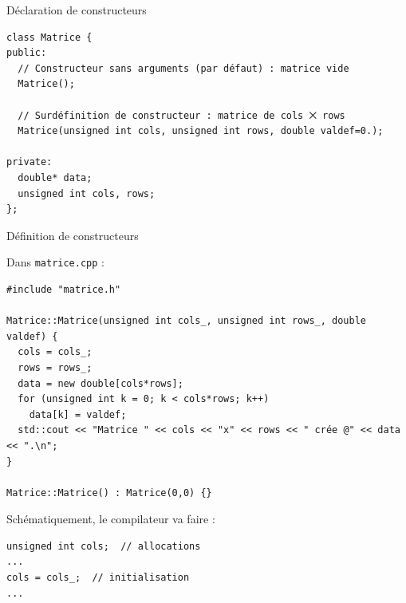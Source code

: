 \documentclass[c]{beamer}
\begin{document}
\begin{frame}[fragile]{Déclaration de constructeurs}
\begin{verbatim}
class Matrice {
public:
  // Constructeur sans arguments (par défaut) : matrice vide
  Matrice();

  // Surdéfinition de constructeur : matrice de cols ⨉ rows
  Matrice(unsigned int cols, unsigned int rows, double valdef=0.);

private:
  double* data;
  unsigned int cols, rows;
};
\end{verbatim}
\end{frame}


\begin{frame}[fragile]{Définition de constructeurs}

Dans \texttt{matrice.cpp} :

\begin{verbatim}
#include "matrice.h"

Matrice::Matrice(unsigned int cols_, unsigned int rows_, double valdef) {
  cols = cols_;
  rows = rows_;
  data = new double[cols*rows];
  for (unsigned int k = 0; k < cols*rows; k++)
    data[k] = valdef;
  std::cout << "Matrice " << cols << "x" << rows << " crée @" << data << ".\n";
}

Matrice::Matrice() : Matrice(0,0) {}
\end{verbatim}

\vspace{1em}
Schématiquement, le compilateur va faire :
\begin{verbatim}
unsigned int cols;  // allocations
...
cols = cols_;  // initialisation
...
\end{verbatim}

\end{frame}

\end{document}
